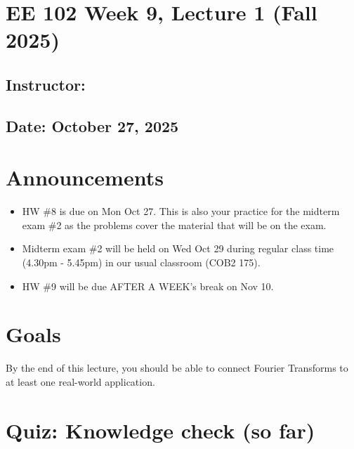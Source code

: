\documentclass{ee102_notes}
\renewcommand{\releasedate}{October 27, 2025}
\begin{document}
\section*{EE 102 Week 9, Lecture 1 (Fall 2025)}
\subsection*{Instructor: \instructor}
\subsection*{Date: \releasedate}
\section{Announcements}
\begin{itemize}
    \item HW \#8 is due on Mon Oct 27. This is also your practice for the midterm exam \#2 as the problems cover the material that will be on the exam.
    \item Midterm exam \#2 will be held on Wed Oct 29 during regular class time (4.30pm - 5.45pm) in our usual classroom (COB2 175).
    \item HW \#9 will be due AFTER A WEEK's break on Nov 10.
\end{itemize}
\section{Goals}

By the end of this lecture, you should be able to connect Fourier Transforms to at least one real-world application. 
\section{Quiz: Knowledge check (so far)}
\end{document}
